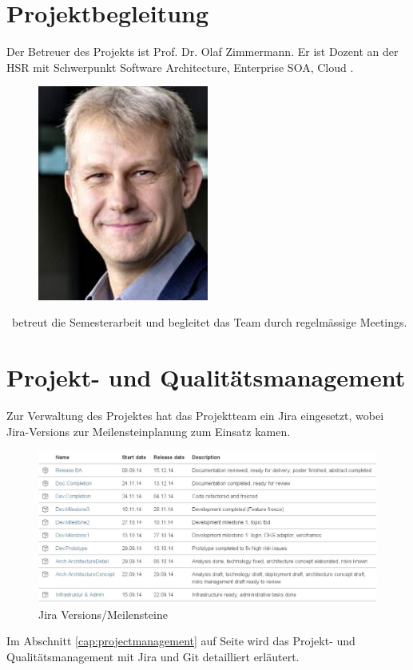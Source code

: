 	\section{Projektbegleitung}
	Der Betreuer des Projekts ist Prof. Dr. Olaf Zimmermann.
	Er ist Dozent an der HSR mit Schwerpunkt Software Architecture, Enterprise SOA, Cloud \cite{zimmermann_ifs_2014}.
	\begin{figure}[H]
		\begin{minipage}[b]{0.5\linewidth}
			\includegraphics[width=0.5\textwidth]{projectPlan/media/img/ozimmermann.jpg}
			\centering
			\caption{\teacher}
			\label{fig:olafzimmermann}
		\end{minipage}
	\end{figure}
	\teacher\ betreut die Semesterarbeit und begleitet das Team durch regelmässige Meetings.


	\section{Projekt- und Qualitätsmanagement}
		Zur Verwaltung des Projektes hat das Projektteam ein Jira eingesetzt,
		wobei Jira-Versions zur Meilensteinplanung zum Einsatz kamen.
		
		\begin{figure}[H]
			\includegraphics[width=\textwidth]{projectPlan/media/img/jiraVersions.jpg}
			\centering
			\caption{Jira Versions/Meilensteine}
			\label{fig:jiraVersions}
		\end{figure}
		
		Im Abschnitt \ref{cap:projectmanagement} auf Seite \pageref{cap:projectmanagement} wird das Projekt- und Qualitätsmanagement mit Jira und Git detailliert erläutert.
	
